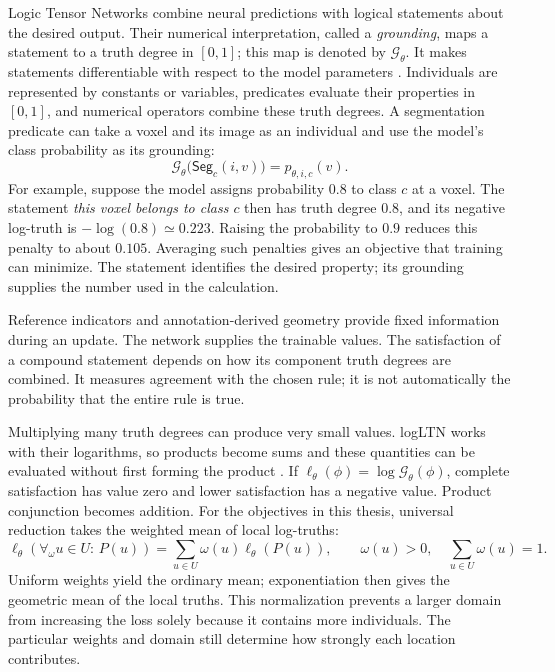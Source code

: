 \documentclass[12pt,a4paper]{article}
\begin{document}
Logic Tensor Networks combine neural predictions with logical statements
about the desired output. Their numerical interpretation, called a
\emph{grounding}, maps a statement to a truth degree in $[0,1]$; this map
is denoted by $\mathcal G_\theta$. It makes statements differentiable
with respect to the model parameters
\cite{badreddine2022logic}. Individuals are represented by constants or
variables, predicates evaluate their properties in $[0,1]$, and numerical
operators combine these truth degrees. A segmentation predicate can take
a voxel and its image as an individual and use the model's class
probability as its grounding:
\begin{equation}
\mathcal{G}_{\theta}\bigl(\mathsf{Seg}_c(i,v)\bigr)
=p_{\theta,i,c}(v).
\label{eq:segmentation-predicate}
\end{equation}
For example, suppose the model assigns probability $0.8$ to class $c$
at a voxel. The statement \emph{this voxel belongs to class $c$} then
has truth degree $0.8$, and its negative log-truth is
$-\log(0.8)\simeq0.223$. Raising the probability to $0.9$ reduces this
penalty to about $0.105$. Averaging such penalties gives an objective
that training can minimize. The statement identifies the desired
property; its grounding supplies the number used in the calculation.

Reference indicators and annotation-derived geometry provide fixed
information during an update. The network supplies the trainable values.
The satisfaction of a compound statement depends on how its component
truth degrees are combined. It measures agreement with the chosen rule;
it is not automatically the probability that the entire rule is true.

Multiplying many truth degrees can produce very small values.
logLTN works with their logarithms, so products become sums and these
quantities can be evaluated without first forming the product
\cite{badreddine2023logltn}. If
$\ell_\theta(\phi)=\log\mathcal G_\theta(\phi)$, complete satisfaction
has value zero and lower satisfaction has a negative value. Product
conjunction becomes addition. For the objectives in this thesis,
universal reduction takes the weighted mean of local log-truths:
\begin{equation}
\ell_{\theta}(\forall_{\omega}u\in U:\,P(u))
=\sum_{u\in U}\omega(u)\ell_{\theta}(P(u)),
\qquad
\omega(u)>0,\quad\sum_{u\in U}\omega(u)=1.
\label{eq:weighted-log-universal}
\end{equation}
Uniform weights yield the ordinary mean; exponentiation then gives the
geometric mean of the local truths. This normalization prevents a larger
domain from increasing the loss solely because it contains more
individuals. The particular weights and domain still determine how
strongly each location contributes.
\end{document}
